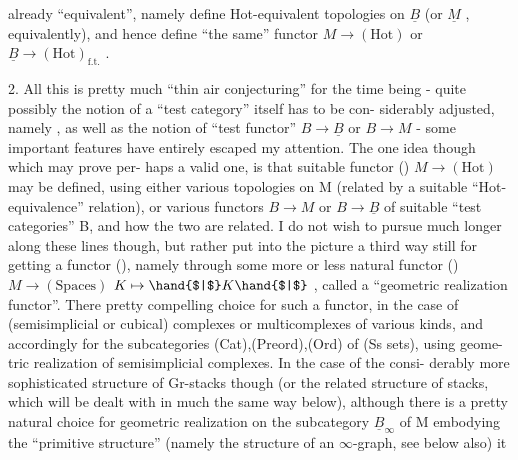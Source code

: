 already ``equivalent'', namely define Hot-equivalent topologies on $\underline{B}$ (or 
$\underline{M}$ , equivalently), and hence define ``the same'' functor $M \to (\mathrm{Hot})$ or
$\underline{B} \to (\mathrm{Hot})_{\mathrm{f.t.}}$ .

2.  All this is pretty much ``thin air conjecturing'' for the time being
- quite possibly the notion of a ``test category'' itself has to be con-%
siderably adjusted, namely , as well as the notion of 
``test functor'' $B \to \underline{B}$ or $B \to M$ -  some important features  have
entirely escaped my attention. The one idea though which may prove per-%
haps a valid one, is that  suitable  functor
() \qquad $M \to (\mathrm{Hot})$
may be defined, using either various topologies on M (related by a
suitable ``Hot-equivalence'' relation), or various functors $B \to M$ or
$B \to \underline{B}$ of suitable ``test categories'' B, and how the two are related.
I do not wish to pursue much longer along these lines though, but
rather put  into the picture a third way still for getting a functor
(), namely through some more or less natural functor
() \qquad $M \to (\mathrm{Spaces})$ \hand{,} \qquad $K \mapsto \hand{$|$}K\hand{$|$}$ ,
called a ``geometric  realization functor''. There  pretty compelling
choice for such a functor, in the case of (semisimplicial or cubical)
complexes or multicomplexes of various kinds, and accordingly for
the subcategories (Cat),(Preord),(Ord) of  (Ss sets), using geome-%
tric realization of semisimplicial complexes. In the case of the consi-%
derably more sophisticated structure of Gr-stacks though (or the related
structure of stacks, which will be dealt with in much the same way
below), although there is a pretty natural choice for geometric
realization on the subcategory $\underline{B}_{\infty}$  of M embodying the ``primitive
structure'' (namely the structure of an $\infty$-graph, see below also)\over{,}{;} it
